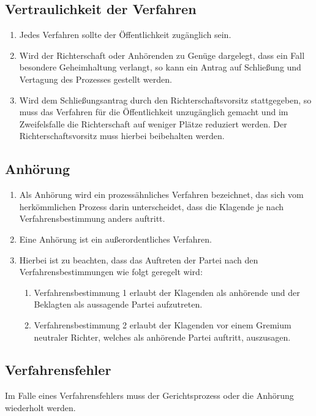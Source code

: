 \documentclass{article}
\begin{document}
\subsection{Vertraulichkeit der Verfahren}
\begin{enumerate}[(1)]
    \item Jedes Verfahren sollte der Öffentlichkeit zugänglich sein.
    \item Wird der Richterschaft oder Anhörenden zu Genüge dargelegt, dass ein Fall besondere Geheimhaltung verlangt, so kann ein Antrag auf Schließung und Vertagung des Prozesses gestellt werden.
    \item Wird dem Schließungsantrag durch den Richterschaftsvorsitz stattgegeben, so muss das Verfahren für die Öffentlichkeit unzugänglich gemacht und im Zweifelsfalle die Richterschaft auf weniger Plätze reduziert werden. Der Richterschaftsvorsitz muss hierbei beibehalten werden.
\end{enumerate}

\subsection{Anhörung}
\begin{enumerate}[(1)]
    \item Als Anhörung wird ein prozessähnliches Verfahren bezeichnet, das sich vom herkömmlichen Prozess darin unterscheidet, dass die Klagende je nach Verfahrensbestimmung anders auftritt.
    \item Eine Anhörung ist ein außerordentliches Verfahren.
    \item Hierbei ist zu beachten, dass das Auftreten der Partei nach den Verfahrensbestimmungen wie folgt geregelt wird:
    \begin{enumerate}[1.]
        \item Verfahrensbestimmung 1 erlaubt der Klagenden als anhörende und der Beklagten als aussagende Partei aufzutreten.
        \item Verfahrensbestimmung 2 erlaubt der Klagenden vor einem Gremium neutraler Richter, welches als anhörende Partei auftritt, auszusagen.
    \end{enumerate}
\end{enumerate}

\subsection{Verfahrensfehler}
Im Falle eines Verfahrensfehlers muss der Gerichtsprozess oder die Anhörung wiederholt werden.
\end{document}
